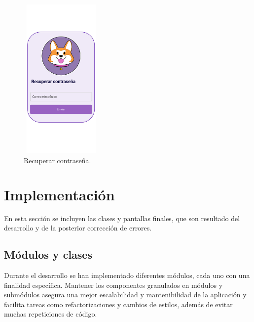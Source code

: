 \documentclass[a4paper, 12pt]{article}
\begin{document}
\begin{figure}[H]
   	\begin{minipage}{0.48\textwidth}
		\begin{center}
			{\includegraphics[height=8cm, width=4cm]{design/PasswordRecovery.jpg}\par}
			\caption{Recuperar contraseña.}
			\medskip
		\end{center}  
	\end{minipage}\hfill
\end{figure}


\newpage
\section{Implementación}

En esta sección se incluyen las clases y pantallas finales, que son resultado del desarrollo y de la posterior corrección de errores.

\subsection{Módulos y clases}

Durante el desarrollo se han implementado diferentes módulos, cada uno con una finalidad específica. Mantener los componentes granulados en módulos y submódulos asegura una mejor escalabilidad y mantenibilidad de la aplicación y facilita tareas como refactorizaciones y cambios de estilos, además de evitar muchas repeticiones de código.
\end{document}
